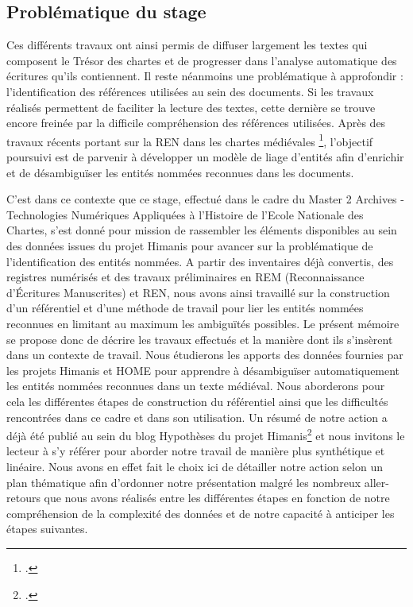 \documentclass[a4paper,12pt,twoside]{book}
\begin{document}
	\subsection*{Problématique du stage}
	
	Ces différents travaux ont ainsi permis de diffuser largement les textes qui composent le Trésor des chartes et de progresser dans l'analyse automatique des écritures qu'ils contiennent. Il reste néanmoins une problématique à approfondir : l'identification des références utilisées au sein des documents. Si les travaux réalisés permettent de faciliter la lecture des textes, cette dernière se trouve encore freinée par la difficile compréhension des références utilisées. Après des travaux récents portant sur la REN dans les chartes médiévales \footcite{torres_aguilar_named_2021}, l'objectif poursuivi est de parvenir à développer un modèle de liage d'entités afin d'enrichir et de désambiguïser les entités nommées reconnues dans les documents. 
	
	C'est dans ce contexte que ce stage, effectué dans le cadre du Master 2 Archives - Technologies Numériques Appliquées à l'Histoire de l'Ecole Nationale des Chartes, s'est donné pour mission de rassembler les éléments disponibles au sein des données issues du projet Himanis pour avancer sur la problématique de l'identification des entités nommées. A partir des inventaires déjà convertis, des registres numérisés et des travaux préliminaires en REM (Reconnaissance d'Écritures Manuscrites) et REN, nous avons ainsi travaillé sur la construction d'un référentiel et d'une méthode de travail pour lier les entités nommées reconnues en limitant au maximum les ambiguïtés possibles. Le présent mémoire se propose donc de décrire les travaux effectués et la manière dont ils s'insèrent dans un contexte de travail. Nous étudierons les apports des données fournies par les projets Himanis et HOME pour apprendre à désambiguïser automatiquement les entités nommées reconnues dans un texte médiéval. Nous aborderons pour cela les différentes étapes de construction du référentiel ainsi que les difficultés rencontrées dans ce cadre et dans son utilisation. Un résumé de notre action a déjà été publié au sein du blog Hypothèses du projet Himanis\footcite{reignier_lindex_2022} et nous invitons le lecteur à s'y référer pour aborder notre travail de manière plus synthétique et linéaire. Nous avons en effet fait le choix ici de détailler notre action selon un plan thématique afin d'ordonner notre présentation malgré les nombreux aller-retours que nous avons réalisés entre les différentes étapes en fonction de notre compréhension de la complexité des données et de notre capacité à anticiper les étapes suivantes.
	
\end{document}
